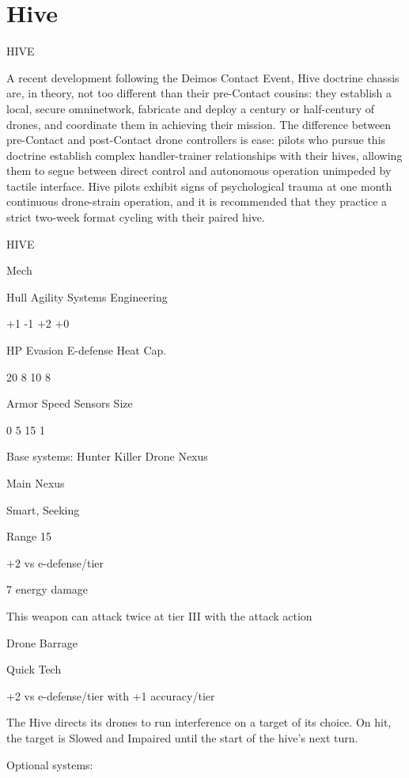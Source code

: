 \section{Hive}

                                                   HIVE

A recent development following the Deimos Contact Event, Hive doctrine chassis are, in theory,
not too different than their pre-Contact cousins: they establish a local, secure omninetwork,
fabricate and deploy a century or half-century of drones, and coordinate them in achieving their
mission. The difference between pre-Contact and post-Contact drone controllers is ease: pilots
who pursue this doctrine establish complex handler-trainer relationships with their hives, allowing
them to segue between direct control and autonomous operation unimpeded by tactile interface.
Hive pilots exhibit signs of psychological trauma at one month continuous drone-strain operation,
and it is recommended that they practice a strict two-week format cycling with their paired hive.

 HIVE

 Mech

 Hull       Agility      Systems       Engineering

 +1         -1           +2            +0

 HP         Evasion      E-defense     Heat Cap.

 20         8            10            8

 Armor      Speed        Sensors       Size

 0          5            15            1

Base systems:
Hunter Killer Drone Nexus

Main Nexus

Smart, Seeking

Range 15

+2 vs e-defense/tier

7 energy damage

This weapon can attack twice at tier III with the attack action


Drone Barrage

Quick Tech

+2 vs e-defense/tier with +1 accuracy/tier

The Hive directs its drones to run interference on a target of its choice. On hit, the target is
Slowed and Impaired until the start of the hive’s next turn.


Optional systems:

